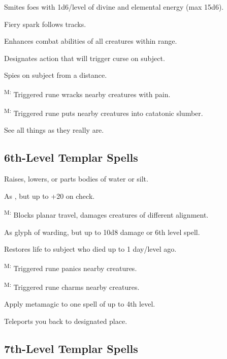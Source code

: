  Smites foes with 1d6/level of divine and elemental energy (max 15d6).

 Fiery spark follows tracks.

 Enhances combat abilities of all creatures within range.

 Designates action that will trigger curse on subject.

 Spies on subject from a distance.

\textsuperscript{M:} Triggered rune wracks nearby creatures with pain.

\textsuperscript{M:} Triggered rune puts nearby creatures into catatonic slumber.

 See all things as they really are.



\subsection{6th-Level Templar Spells}

 Raises, lowers, or parts bodies of water or silt.

 As , but up to +20 on check.

\textsuperscript{M:} Blocks planar travel, damages creatures of different alignment.

 As glyph of warding, but up to 10d8 damage or 6th level spell.

 Restores life to subject who died up to 1 day/level ago.

\textsuperscript{M:} Triggered rune panics nearby creatures.

\textsuperscript{M:} Triggered rune charms nearby creatures.

 Apply metamagic to one spell of up to 4th level.

 Teleports you back to designated place.



\subsection{7th-Level Templar Spells}

